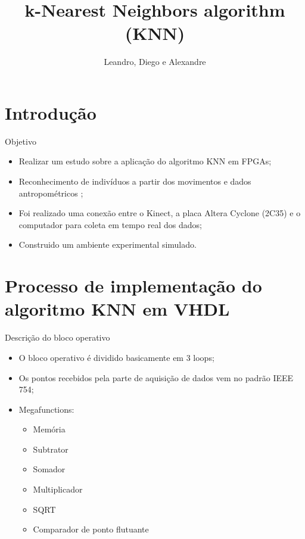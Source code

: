 \documentclass[11pt]{beamer}
\author{Leandro, Diego e Alexandre}
\title{k-Nearest Neighbors algorithm (KNN)}
\begin{document}
\begin{frame}
\titlepage
\end{frame}

\begin{frame}
\tableofcontents
\end{frame}

\section{Introdução}

\begin{frame}{Objetivo}
	\begin{itemize}
	\item Realizar um estudo sobre a aplicação do algoritmo KNN em FPGAs;
	\item Reconhecimento de indivíduos a partir dos movimentos e dados
	antropométricos \cite{granaidentificaccao};
	\item Foi realizado uma conexão entre o Kinect, a placa Altera Cyclone
	(2C35) e o computador para coleta em tempo real dos dados;
	\item Construido um ambiente experimental simulado. 
	\end{itemize}
\end{frame}

\section{Processo de implementação do algoritmo KNN em VHDL}

\begin{frame}{Descrição do bloco operativo}
	\begin{itemize}
	\item O bloco operativo é dividido basicamente em 3 loops;
	\item Os pontos recebidos pela parte de aquisição de dados vem no padrão
	IEEE 754;
	\item Megafunctions:
		\begin{itemize}
		\item Memória
		\item Subtrator
		\item Somador
		\item Multiplicador
		\item SQRT
		\item Comparador de ponto flutuante
		\end{itemize}
	\end{itemize}
\end{frame}
\end{document}
